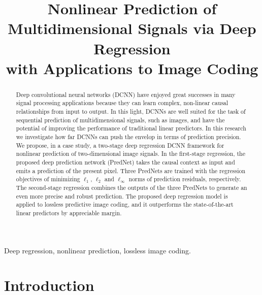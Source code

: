 \documentclass{article}
\title{Nonlinear Prediction of Multidimensional Signals via Deep Regression \\
		 with Applications to Image Coding}
\begin{document}
%
\maketitle
%
\begin{abstract}
Deep convolutional neural networks (DCNN) have enjoyed great successes in many signal processing applications because they can learn complex, non-linear causal relationships from input to output.  In this light, DCNNs are well suited for the task of sequential prediction of multidimensional signals, such as images, and have the potential of improving the performance of traditional linear predictors.  In this research we investigate how far DCNNs can push the envelop in terms of prediction precision.  We propose, in a case study, a two-stage deep regression DCNN framework for nonlinear prediction of two-dimensional image signals.  In the first-stage regression, the proposed deep prediction network (PredNet) takes the causal context as input and emits a prediction of the present pixel.  Three PredNets are trained with the regression objectives of minimizing $\ell_1$, $\ell_2$ and $\ell_\infty$ norms of prediction residuals, respectively.
The second-stage regression combines the outputs of the three PredNets to generate an even more precise and robust prediction.
The proposed deep regression model is applied to lossless predictive image coding, and it outperforms the state-of-the-art linear predictors by appreciable margin.
\end{abstract}
%
\begin{keywords}
Deep regression, nonlinear prediction, lossless image coding.
\end{keywords}
%
\section{Introduction}

%
\end{document}
